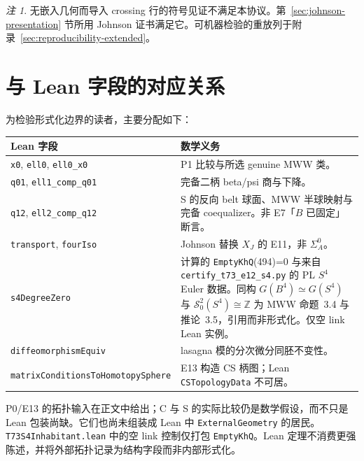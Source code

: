 \documentclass[11pt]{amsart}
\theoremstyle{definition}
\theoremstyle{remark}
\newtheorem{remark}[theorem]{注}
\begin{document}
\begin{remark}
无嵌入几何而导入 crossing 行的符号见证不满足本协议。第~\ref{sec:johnson-presentation} 节所用 Johnson 证书满足它。可机器检验的重放列于附录~\ref{sec:reproducibility-extended}。
\end{remark}

\section{与 Lean 字段的对应关系}\label{app:lean-fields}

为检验形式化边界的读者，主要分配如下：
\begin{center}
\small
\begin{tabularx}{\textwidth}{@{}l X@{}}
\toprule
Lean 字段 & 数学义务 \\
\midrule
\texttt{x0}, \texttt{ell0}, \texttt{ell0\_x0} & P1 比较与所选 genuine MWW 类。 \\
\texttt{q01}, \texttt{ell1\_comp\_q01} & 完备二柄 beta/psi 商与下降。 \\
\texttt{q12}, \texttt{ell2\_comp\_q12} & S 的反向 belt 球面、MWW 半球映射与完备 coequalizer。非 E7「$B$ 已固定」断言。 \\
\texttt{transport}, \texttt{fourIso} & Johnson 替换 $X_J$ 的 E11，非 $\Sigma_A^0$。 \\
\texttt{s4DegreeZero} & 计算的 \texttt{EmptyKhQ}(494)=0 与来自 \texttt{certify\_t73\_e12\_s4.py} 的 PL $S^4$ Euler 数据。同构 $G(B^4)\simeq G(S^4)$ 与 $\mathcal S^2_0(S^4)\cong\mathbb Z$ 为 MWW 命题~3.4 与推论~3.5，引用而非形式化。仅空 link Lean 实例。 \\
\texttt{diffeomorphismEquiv} & lasagna 模的分次微分同胚不变性。 \\
\texttt{matrixConditionsToHomotopySphere} & E13 构造 CS 柄图；Lean \texttt{CSTopologyData} 不可居。 \\
\bottomrule
\end{tabularx}
\end{center}

P0/E13 的拓扑输入在正文中给出；C 与 S 的实际比较仍是数学假设，而不只是
Lean 包装尚缺。它们也尚未组装成 Lean 中 \texttt{ExternalGeometry} 的居民。
\texttt{T73S4Inhabitant.lean} 中的空 link 控制仅打包 \texttt{EmptyKhQ}。Lean 定理不消费更强陈述，并将外部拓扑记录为结构字段而非内部形式化。



\end{document}
